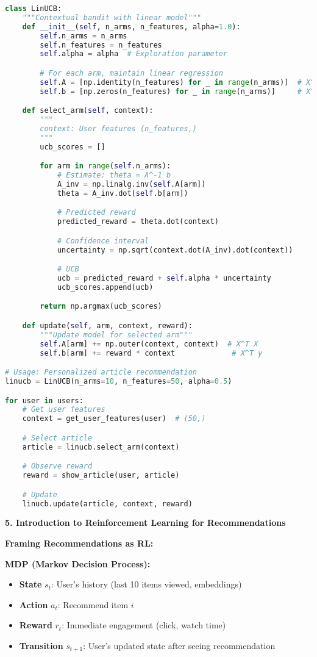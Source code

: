 \documentclass[10pt]{article}
\begin{document}
\begin{lstlisting}[language=Python]
class LinUCB:
    """Contextual bandit with linear model"""
    def __init__(self, n_arms, n_features, alpha=1.0):
        self.n_arms = n_arms
        self.n_features = n_features
        self.alpha = alpha  # Exploration parameter

        # For each arm, maintain linear regression
        self.A = [np.identity(n_features) for _ in range(n_arms)]  # X^T X
        self.b = [np.zeros(n_features) for _ in range(n_arms)]     # X^T y

    def select_arm(self, context):
        """
        context: User features (n_features,)
        """
        ucb_scores = []

        for arm in range(self.n_arms):
            # Estimate: theta = A^-1 b
            A_inv = np.linalg.inv(self.A[arm])
            theta = A_inv.dot(self.b[arm])

            # Predicted reward
            predicted_reward = theta.dot(context)

            # Confidence interval
            uncertainty = np.sqrt(context.dot(A_inv).dot(context))

            # UCB
            ucb = predicted_reward + self.alpha * uncertainty
            ucb_scores.append(ucb)

        return np.argmax(ucb_scores)

    def update(self, arm, context, reward):
        """Update model for selected arm"""
        self.A[arm] += np.outer(context, context)  # X^T X
        self.b[arm] += reward * context             # X^T y

# Usage: Personalized article recommendation
linucb = LinUCB(n_arms=10, n_features=50, alpha=0.5)

for user in users:
    # Get user features
    context = get_user_features(user)  # (50,)

    # Select article
    article = linucb.select_arm(context)

    # Observe reward
    reward = show_article(user, article)

    # Update
    linucb.update(article, context, reward)
\end{lstlisting}

\textbf{5. Introduction to Reinforcement Learning for Recommendations}

\textbf{Framing Recommendations as RL:}

\textbf{MDP (Markov Decision Process):}
\begin{itemize}
\item \textbf{State} $s_t$: User's history (last 10 items viewed, embeddings)
\item \textbf{Action} $a_t$: Recommend item $i$
\item \textbf{Reward} $r_t$: Immediate engagement (click, watch time)
\item \textbf{Transition} $s_{t+1}$: User's updated state after seeing recommendation
\end{itemize}
\end{document}
